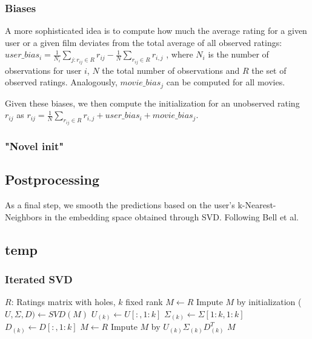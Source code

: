 \documentclass[10pt,conference,compsocconf]{IEEEtran}
\begin{document}
\subsubsection{Biases}
A more sophisticated idea is to compute how much the average rating for a given user or a given film deviates from the total average of all observed ratings: $user\_bias_i = \frac{1}{N_i} \sum_{j : r_{ij} \in R} r_{ij} - \frac{1}{N} \sum_{r_{ij} \in R} r_{i,j}$ , where $N_i$ is the number of observations for user $i$, $N$ the total number of observations and $R$ the set of observed ratings. Analogously, $movie\_bias_j$ can be computed for all movies. 

Given these biases, we then compute the initialization for an unobserved rating $r_{ij}$ as $r_{ij} = \frac{1}{N} \sum_{r_{ij} \in R} r_{i,j} + user\_bias_i + movie\_bias_j$.

\subsubsection{"Novel init"}



\subsection{Postprocessing}
As a final step, we smooth the predictions based on the user's  k-Nearest-Neighbors in the embedding space obtained through SVD. Following Bell et al. \cite{bell2007improved}

\subsection{temp}
\subsubsection{Iterated SVD}
\begin{algorithmic}
	\STATE $R$: Ratings matrix with holes, $k$ fixed rank
	\STATE $M \leftarrow R$
	\STATE Impute $M$ by initialization
    	\STATE ($U, \Sigma, D) \leftarrow SVD(M)$
    	\STATE $U_{(k)} \leftarrow U[:, 1:k]$
    	\STATE $\Sigma_{(k)} \leftarrow \Sigma[1:k, 1:k]$
    	\STATE $D_{(k)} \leftarrow D[:, 1:k]$
    	\STATE $M \leftarrow R$
    	\STATE Impute $M$ by $U_{(k)} \Sigma_{(k)} D_{(k)}^T$
    \ENDFOR
    \RETURN $M$
\end{algorithmic}
\end{document}
